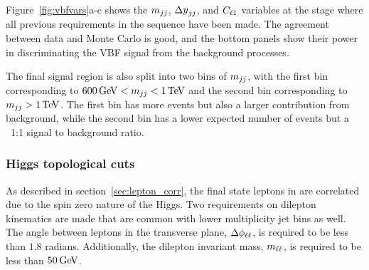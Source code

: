 Figure~\ref{fig:vbfvars}a-c shows the $m_{jj}$, $\dyjj$, and $C_{\ell1}$ variables at the stage where all previous requirements in the sequence have been made. The agreement between data and Monte Carlo is good, and the bottom panels show their power in discriminating the VBF signal from the background processes. 

The final signal region is also split into two bins of $m_{jj}$, with the first bin corresponding to $600 \GeV < \mjj < 1 \TeV$ and the second bin corresponding to $\mjj > 1 \TeV$. The first bin has more events but also a larger contribution from background, while the second bin has a lower expected number of events but a ~1:1 signal to background ratio. 


\subsubsection{Higgs topological cuts}

As described in section~\ref{sec:lepton_corr}, the final state leptons in \HWWfull are correlated due to the spin zero nature of the Higgs. Two requirements on dilepton kinematics are made that are common with lower multiplicity jet bins as well. The angle between leptons in the transverse plane, $\Delta\phi_{\ell\ell}$, is required to be less than $1.8$ radians. Additionally, the dilepton invariant mass, $m_{\ell\ell}$, is required to be less than $50 \GeV$. 

